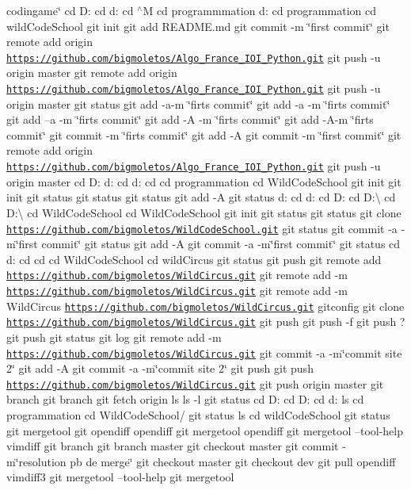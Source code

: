 codingame\char`\"{} cd D\+: cd d\+: cd $^\wedge$M cd programmmation d\+: cd programmation cd wild\+Code\+School git init git add R\+E\+A\+D\+M\+E.\+md git commit -\/m \char`\"{}first commit\char`\"{} git remote add origin \href{https://github.com/bigmoletos/Algo_France_IOI_Python.git}{\tt https\+://github.\+com/bigmoletos/\+Algo\+\_\+\+France\+\_\+\+I\+O\+I\+\_\+\+Python.\+git} git push -\/u origin master git remote add origin \href{https://github.com/bigmoletos/Algo_France_IOI_Python.git}{\tt https\+://github.\+com/bigmoletos/\+Algo\+\_\+\+France\+\_\+\+I\+O\+I\+\_\+\+Python.\+git} git push -\/u origin master git status git add -\/a-\/m \char`\"{}firts commit\char`\"{} git add -\/a -\/m \char`\"{}firts commit\char`\"{} git add --a -\/m \char`\"{}firts commit\char`\"{} git add -\/A -\/m \char`\"{}firts commit\char`\"{} git add -\/\+A-\/m \char`\"{}firts commit\char`\"{} git commit -\/m \char`\"{}firts commit\char`\"{} git add -\/A git commit -\/m \char`\"{}first commit\char`\"{} git remote add origin \href{https://github.com/bigmoletos/Algo_France_IOI_Python.git}{\tt https\+://github.\+com/bigmoletos/\+Algo\+\_\+\+France\+\_\+\+I\+O\+I\+\_\+\+Python.\+git} git push -\/u origin master cd D\+: d\+: cd d\+: cd  cd programmation cd Wild\+Code\+School git init git init git status git status git status git add -\/A git status d\+: cd d\+: cd D\+: cd D\+:\textbackslash{} cd D\+:\textbackslash{} cd Wild\+Code\+School cd Wild\+Code\+School git init git status git status git clone \href{https://github.com/bigmoletos/WildCodeSchool.git}{\tt https\+://github.\+com/bigmoletos/\+Wild\+Code\+School.\+git} git status git commit -\/a -\/m\char`\"{}first commit\char`\"{} git status git add -\/A git commit -\/a -\/m\char`\"{}first commit\char`\"{} git status cd d\+: cd  cd  cd Wild\+Code\+School cd wild\+Circus git status git push git remote add \href{https://github.com/bigmoletos/WildCircus.git}{\tt https\+://github.\+com/bigmoletos/\+Wild\+Circus.\+git} git remote add -\/m \href{https://github.com/bigmoletos/WildCircus.git}{\tt https\+://github.\+com/bigmoletos/\+Wild\+Circus.\+git} git remote add -\/m Wild\+Circus \href{https://github.com/bigmoletos/WildCircus.git}{\tt https\+://github.\+com/bigmoletos/\+Wild\+Circus.\+git} gitconfig git clone \href{https://github.com/bigmoletos/WildCircus.git}{\tt https\+://github.\+com/bigmoletos/\+Wild\+Circus.\+git} git push git push -\/f git push ? git push git status git log git remote add -\/m \href{https://github.com/bigmoletos/WildCircus.git}{\tt https\+://github.\+com/bigmoletos/\+Wild\+Circus.\+git} git commit -\/a -\/m\char`\"{}commit site 2\char`\"{} git add -\/A git commit -\/a -\/m\char`\"{}commit site 2\char`\"{} git push git push \href{https://github.com/bigmoletos/WildCircus.git}{\tt https\+://github.\+com/bigmoletos/\+Wild\+Circus.\+git} git push origin master git branch git branch git fetch origin ls ls -\/l git status cd D\+: cd D\+: cd d\+: ls cd programmation cd Wild\+Code\+School/ git status ls cd wild\+Code\+School git status git mergetool git opendiff opendiff git mergetool opendiff git mergetool --tool-\/help vimdiff git branch git branch master git checkout master git commit -\/m\char`\"{}resolution pb de merge\char`\"{} git checkout master git checkout dev git pull opendiff vimdiff3 git mergetool --tool-\/help git mergetool 
